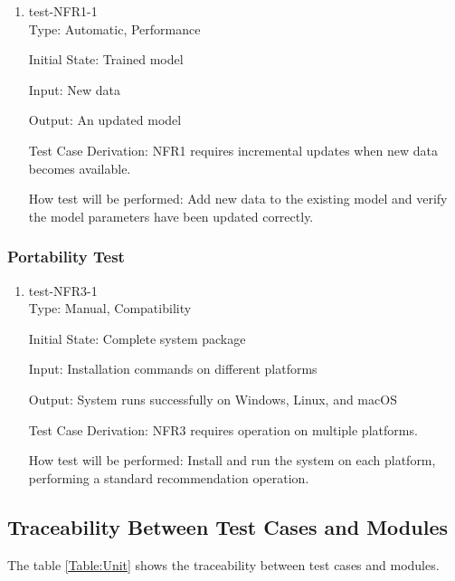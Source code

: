 \documentclass[12pt, titlepage]{article}
\begin{document}
\begin{enumerate}

\item{test-NFR1-1\\}
Type: Automatic, Performance
					
Initial State: Trained model
					
Input: New data
					
Output: An updated model

Test Case Derivation: NFR1 requires incremental updates when new data becomes available.

How test will be performed: Add new data to the existing model and verify the model parameters have been updated correctly.
\end{enumerate}

\subsubsection{Portability Test}

\begin{enumerate}

\item{test-NFR3-1\\}
Type: Manual, Compatibility
					
Initial State: Complete system package
					
Input: Installation commands on different platforms
					
Output: System runs successfully on Windows, Linux, and macOS

Test Case Derivation: NFR3 requires operation on multiple platforms.

How test will be performed: Install and run the system on each platform, performing a standard recommendation operation.

\end{enumerate}

\subsection{Traceability Between Test Cases and Modules}
The table \ref{Table:Unit} shows the traceability between test cases and modules.
\end{document}
